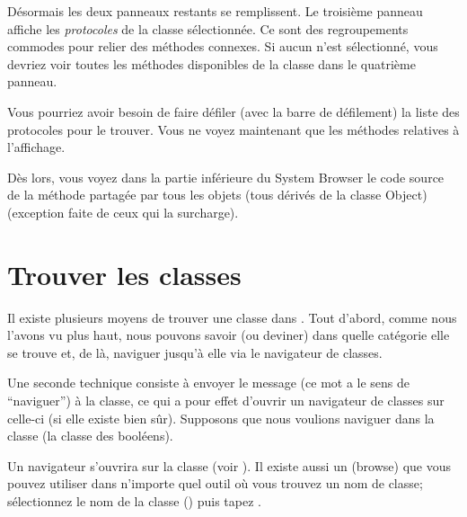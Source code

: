 \documentclass[a4paper,10pt,twoside]{book}
\begin{document}
D\'esormais les deux panneaux restants se remplissent.
Le troisi\`eme panneau affiche les \emph{protocoles} de la classe
s\'electionn\'ee.
Ce sont des regroupements commodes pour relier des m\'ethodes
connexes. Si aucun  n'est s\'electionn\'e, vous devriez
voir toutes les m\'ethodes disponibles de la classe dans le
quatri\`eme panneau.

Vous pourriez avoir besoin de faire d\'efiler (avec la barre de
d\'efilement) la liste des protocoles pour le trouver.
Vous ne voyez maintenant que les m\'ethodes relatives \`a
l'affichage.

D\`es lors, vous voyez dans la partie inf\'erieure du System Browser
le code source de la m\'ethode  partag\'ee par tous
les objets 
(tous dérivés de la classe Object)
(exception faite de ceux qui la surcharge).

\section{Trouver les classes}

Il existe plusieurs moyens de trouver une classe dans \sq.
Tout d'abord, comme nous l'avons vu plus haut, nous pouvons savoir (ou
deviner) dans quelle cat\'egorie elle se trouve et, de l\`a, naviguer
jusqu'\`a elle via le navigateur de classes.

Une seconde technique consiste \`a envoyer le message 
(ce mot a le sens de ``naviguer'') \`a la classe, ce qui a pour effet
d'ouvrir un navigateur de classes sur celle-ci
(si elle existe bien s\^ur).
Supposons que nous voulions naviguer dans la classe 
(la classe des bool\'eens).

Un navigateur s'ouvrira sur la classe  (voir ).
Il existe aussi un   (browse) que vous
pouvez utiliser dans n'importe quel outil o\`u vous trouvez un nom de
classe;
s\'electionnez le nom de la classe 
(\parex {})
puis tapez .
\end{document}
